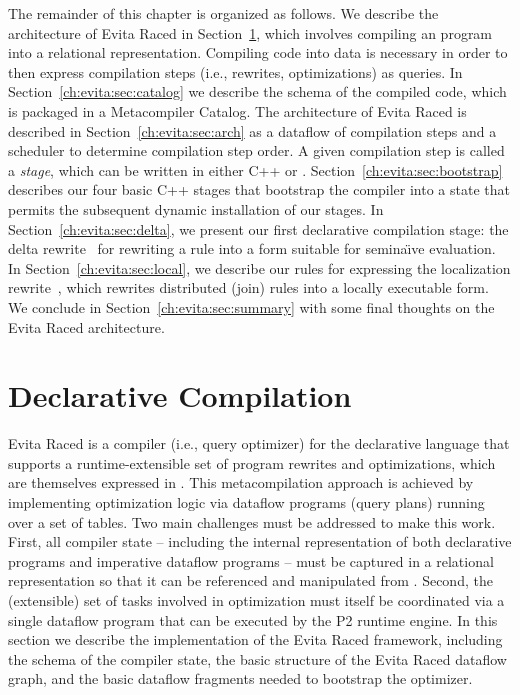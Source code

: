 The remainder of this chapter is organized as follows.  We describe the
architecture of Evita Raced in Section~\ref{ch:evita:sec:compile}, which
involves compiling an \OVERLOG program into a relational representation.
Compiling code into data is necessary in order to then express compilation
steps (i.e., rewrites, optimizations) as queries.  In
Section~\ref{ch:evita:sec:catalog} we describe the schema of the compiled code,
which is packaged in a Metacompiler Catalog.  The architecture of Evita Raced
is described in Section~\ref{ch:evita:sec:arch} as a dataflow of compilation
steps and a scheduler to determine compilation step order.  A given compilation
step is called a {\em stage}, which can be written in either C++ or \OVERLOG.
Section~\ref{ch:evita:sec:bootstrap} describes our four basic C++ stages that
bootstrap the compiler into a state that permits the subsequent dynamic
installation of our \OVERLOG stages.  In Section~\ref{ch:evita:sec:delta}, we
present our first declarative compilation stage: the delta
rewrite~\cite{loo-sigmod06} for rewriting a rule into a form suitable for
semina\"{\i}ve evaluation.  In Section~\ref{ch:evita:sec:local}, we describe our
\OVERLOG rules for expressing the localization rewrite~\cite{p2:sosp}, which
rewrites distributed (join) rules into a locally executable form.  We conclude
in Section~\ref{ch:evita:sec:summary} with some final thoughts on the Evita
Raced architecture.  

\section{Declarative Compilation}
\label{ch:evita:sec:compile}

Evita Raced is a compiler (i.e., query optimizer) for the \OVERLOG declarative
language that supports a runtime-extensible set of program rewrites and
optimizations, which are themselves expressed in \OVERLOG.  This
metacompilation approach is achieved by implementing optimization logic via
dataflow programs (query plans) running over a set of tables.  Two main
challenges must be addressed to make this work.  First, all compiler state --
including the internal representation of both declarative \OVERLOG programs and
imperative dataflow programs -- must be captured in a relational representation
so that it can be referenced and manipulated from \OVERLOG.  Second, the
(extensible) set of tasks involved in optimization must itself be coordinated
via a single dataflow program that can be executed by the P2 runtime engine.
In this section we describe the implementation of the Evita Raced framework,
including the schema of the compiler state, the basic structure of the Evita
Raced dataflow graph, and the basic dataflow fragments needed to bootstrap the
optimizer.

